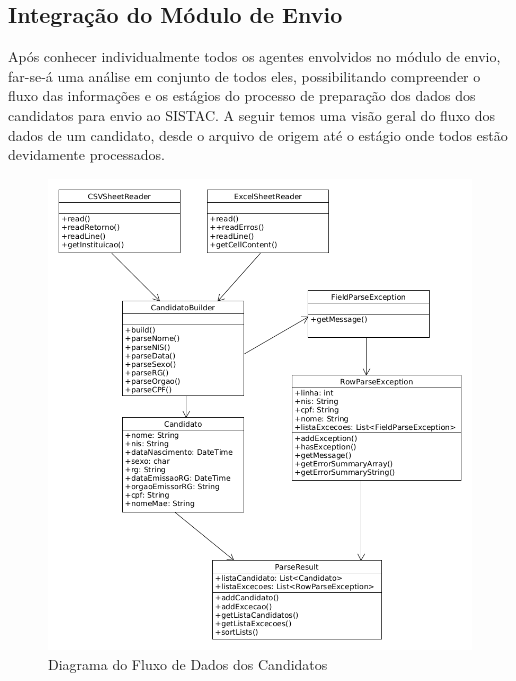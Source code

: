 \documentclass[
	12pt,			%
	openright,		%
	oneside,	
	a4paper,		%
	english,		%
	brazil			%
]{abntex2/abntex2}  %
\begin{document}
	\subsection{Integração do Módulo de Envio}
	
	Após conhecer individualmente todos os agentes envolvidos no módulo de envio, far-se-á uma análise em conjunto de todos eles, possibilitando compreender o fluxo das informações e os estágios do processo de preparação dos dados dos candidatos para envio ao SISTAC. A seguir temos uma visão geral do fluxo dos dados de um candidato, desde o arquivo de origem até o estágio onde todos estão devidamente processados.
	
	\begin{figure}[H]
		\begin{center}
			
			\caption{Diagrama do Fluxo de Dados dos Candidatos}
			\label{envio-uml}
			
			\includegraphics[scale=0.5]{img/envio-uml}
			
		\end{center}
	\end{figure}
	
\end{document}
